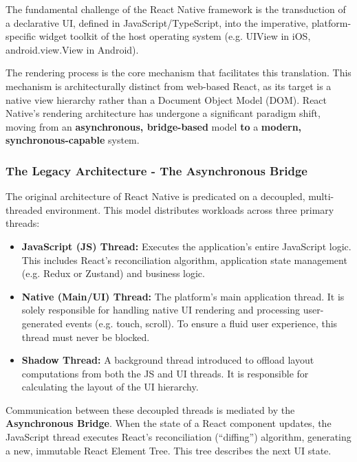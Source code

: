         The fundamental challenge of the React Native framework is the transduction of a declarative UI, defined in JavaScript/TypeScript, into the imperative, platform-specific widget toolkit of the host operating system (e.g. UIView in iOS, android.view.View in Android).
        
        The rendering process is the core mechanism that facilitates this translation. This mechanism is architecturally distinct from web-based React, as its target is a native view hierarchy rather than a Document Object Model (DOM). React Native's rendering architecture has undergone a significant paradigm shift, moving from an \textbf{asynchronous, bridge-based} model \textbf{to} a \textbf{modern, synchronous-capable} system.
        
        \subsubsection{The Legacy Architecture - The Asynchronous Bridge}
        The original architecture of React Native is predicated on a decoupled, multi-threaded environment. This model distributes workloads across three primary threads: 
        \begin{itemize}
            \item \textbf{JavaScript (JS) Thread:} Executes the application's entire JavaScript logic. This includes React's reconciliation algorithm, application state management (e.g. Redux or Zustand) and business logic.

            \item \textbf{Native (Main/UI) Thread:} The platform's main application thread. It is solely responsible for handling native UI rendering and processing user-generated events (e.g. touch, scroll). To ensure a fluid user experience, this thread must never be blocked.

            \item \textbf{Shadow Thread:} A background thread introduced to offload layout computations from both the JS and UI threads. It is responsible for calculating the layout of the UI hierarchy. 
        \end{itemize}        
        
        Communication between these decoupled threads is mediated by the \textbf{Asynchronous Bridge}. When the state of a React component updates, the JavaScript thread executes React's reconciliation (``diffing'') algorithm, generating a new, immutable React Element Tree. This tree describes the next UI state.
        
